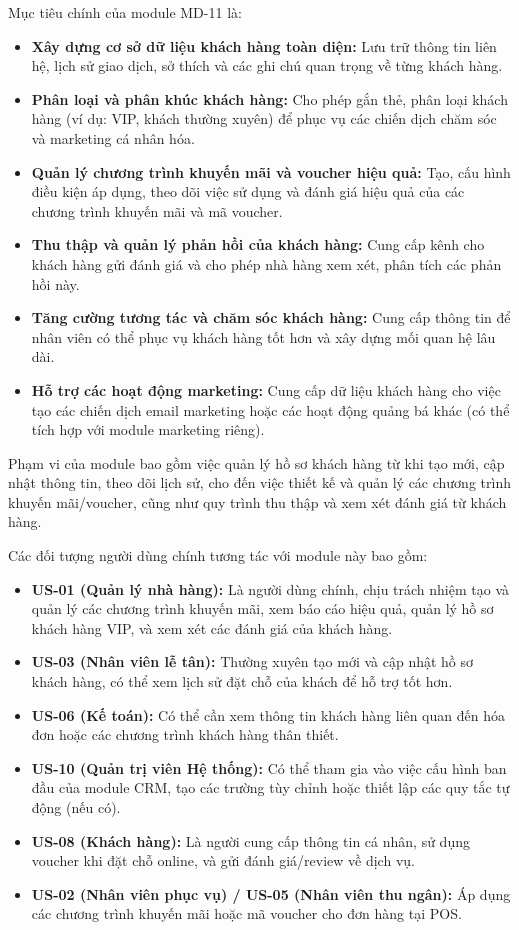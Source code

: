 \label{sssec:md11_objectives_scope}
Mục tiêu chính của module MD-11 là:
\begin{itemize}
    \item \textbf{Xây dựng cơ sở dữ liệu khách hàng toàn diện:} Lưu trữ thông tin liên hệ, lịch sử giao dịch, sở thích và các ghi chú quan trọng về từng khách hàng.
    \item \textbf{Phân loại và phân khúc khách hàng:} Cho phép gắn thẻ, phân loại khách hàng (ví dụ: VIP, khách thường xuyên) để phục vụ các chiến dịch chăm sóc và marketing cá nhân hóa.
    \item \textbf{Quản lý chương trình khuyến mãi và voucher hiệu quả:} Tạo, cấu hình điều kiện áp dụng, theo dõi việc sử dụng và đánh giá hiệu quả của các chương trình khuyến mãi và mã voucher.
    \item \textbf{Thu thập và quản lý phản hồi của khách hàng:} Cung cấp kênh cho khách hàng gửi đánh giá và cho phép nhà hàng xem xét, phân tích các phản hồi này.
    \item \textbf{Tăng cường tương tác và chăm sóc khách hàng:} Cung cấp thông tin để nhân viên có thể phục vụ khách hàng tốt hơn và xây dựng mối quan hệ lâu dài.
    \item \textbf{Hỗ trợ các hoạt động marketing:} Cung cấp dữ liệu khách hàng cho việc tạo các chiến dịch email marketing hoặc các hoạt động quảng bá khác (có thể tích hợp với module marketing riêng).
\end{itemize}
Phạm vi của module bao gồm việc quản lý hồ sơ khách hàng từ khi tạo mới, cập nhật thông tin, theo dõi lịch sử, cho đến việc thiết kế và quản lý các chương trình khuyến mãi/voucher, cũng như quy trình thu thập và xem xét đánh giá từ khách hàng.

\label{sssec:md11_primary_users}
Các đối tượng người dùng chính tương tác với module này bao gồm:
\begin{itemize}
    \item \textbf{US-01 (Quản lý nhà hàng):} Là người dùng chính, chịu trách nhiệm tạo và quản lý các chương trình khuyến mãi, xem báo cáo hiệu quả, quản lý hồ sơ khách hàng VIP, và xem xét các đánh giá của khách hàng.
    \item \textbf{US-03 (Nhân viên lễ tân):} Thường xuyên tạo mới và cập nhật hồ sơ khách hàng, có thể xem lịch sử đặt chỗ của khách để hỗ trợ tốt hơn.
    \item \textbf{US-06 (Kế toán):} Có thể cần xem thông tin khách hàng liên quan đến hóa đơn hoặc các chương trình khách hàng thân thiết.
    \item \textbf{US-10 (Quản trị viên Hệ thống):} Có thể tham gia vào việc cấu hình ban đầu của module CRM, tạo các trường tùy chỉnh hoặc thiết lập các quy tắc tự động (nếu có).
    \item \textbf{US-08 (Khách hàng):} Là người cung cấp thông tin cá nhân, sử dụng voucher khi đặt chỗ online, và gửi đánh giá/review về dịch vụ.
    \item \textbf{US-02 (Nhân viên phục vụ) / US-05 (Nhân viên thu ngân):} Áp dụng các chương trình khuyến mãi hoặc mã voucher cho đơn hàng tại POS.
\end{itemize}

